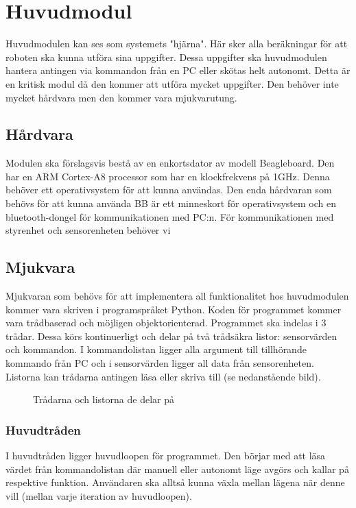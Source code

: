 \setcounter{secnumdepth}{5}
\section{Huvudmodul}
Huvudmodulen kan ses som systemets "hjärna". Här sker alla beräkningar för att roboten ska kunna utföra sina uppgifter. Dessa uppgifter ska huvudmodulen hantera antingen via kommandon från en PC eller skötas helt autonomt. Detta är en kritisk modul då den kommer att utföra mycket uppgifter. Den behöver inte mycket hårdvara men den kommer vara mjukvarutung.
\subsection{Hårdvara}
Modulen ska förslagsvis bestå av en enkortsdator av modell Beagleboard. Den har en ARM Cortex-A8 processor som har en klockfrekvens på 1GHz. Denna behöver ett operativsystem för att kunna användas. Den enda hårdvaran som behövs för att kunna använda BB är ett minneskort för operativsystem och en bluetooth-dongel för kommunikationen med PC:n. För kommunikationen med styrenhet och sensorenheten behöver vi 
\subsection{Mjukvara}
Mjukvaran som behövs för att implementera all funktionalitet hos huvudmodulen kommer vara skriven i programspråket Python. Koden för programmet kommer vara trådbaserad och möjligen objektorienterad. 
\newline
Programmet ska indelas i 3 trådar. Dessa körs kontinuerligt och delar på två trådsäkra listor: sensorvärden och kommandon. I kommandolistan ligger alla argument till tillhörande kommando från PC och i sensorvärden ligger all data från sensorenheten. Listorna kan trådarna antingen läsa eller skriva till (se nedanstående bild).

\begin{figure}[h]
\scalebox{0.8}{}
\caption{Trådarna och listorna de delar på}
\end{figure}

\subsubsection{Huvudtråden}
I huvudtråden ligger huvudloopen för programmet. Den börjar med att läsa värdet från kommandolistan där manuell eller autonomt läge avgörs och kallar på respektive funktion. Användaren ska alltså kunna växla mellan lägena när denne vill (mellan varje iteration av huvudloopen).
